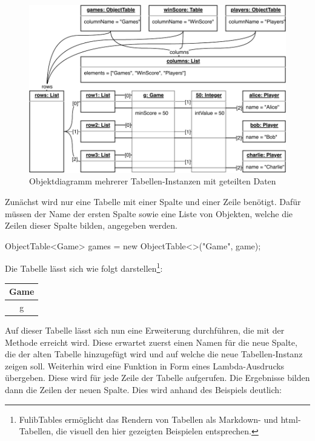 \begin{figure}
    \includegraphics[width=\textwidth]{chapter/pattern-matching/img/tables-object-diagram.pdf}
    \caption{Objektdiagramm mehrerer Tabellen-Instanzen mit geteilten Daten}
    \label{fig:tables-object-diagram}
\end{figure}

Zunächst wird nur eine Tabelle mit einer Spalte und einer Zeile benötigt.
Dafür müssen der Name der ersten Spalte sowie eine Liste von Objekten, welche die Zeilen dieser Spalte bilden, angegeben werden.

\begin{jcodeblock}
    ObjectTable<Game> games = new ObjectTable<>("Game", game);
\end{jcodeblock}

Die Tabelle lässt sich wie folgt darstellen\footnote{FulibTables ermöglicht das Rendern von Tabellen als Markdown- und \ac{html}-Tabellen, die visuell den hier gezeigten Beispielen entsprechen.}:

\begin{tabular}{|c|}
    \hline
    \textbf{Game} \\
    \hline
    g \\
    \hline
\end{tabular}

Auf dieser Tabelle lässt sich nun eine Erweiterung durchführen, die mit der Methode  erreicht wird.
Diese erwartet zuerst einen Namen für die neue Spalte, die der alten Tabelle hinzugefügt wird und auf welche die neue Tabellen-Instanz zeigen soll.
Weiterhin wird eine Funktion in Form eines Lambda-Ausdrucks übergeben.
Diese wird für jede Zeile der Tabelle aufgerufen.
Die Ergebnisse bilden dann die Zeilen der neuen Spalte.
Dies wird anhand des Beispiels deutlich:

